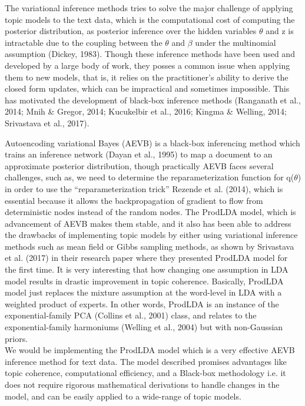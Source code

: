 \documentclass[11pt]{article}
\theoremstyle{definition}
\theoremstyle{theorem}
\newcommand{\response}{\medskip\noindent{\color{DarkBlue}\textbf{Response:}}}
\begin{document}
\response

The variational inference methods tries to solve the major challenge of applying topic models to the text data, which is the computational cost of computing the posterior distribution, as posterior inference over the hidden variables $\theta$ and z is intractable due to the coupling between the $\theta$ and $\beta$ under the multinomial assumption (Dickey, 1983). Though these inference methods have been used and developed by a large body of work, they posses a common issue when applying them to new models, that is, it relies on the practitioner’s ability to derive the closed form updates, which can be impractical and sometimes impossible. This has motivated the development of black-box inference methods (Ranganath et al., 2014; Mnih & Gregor, 2014; Kucukelbir et al., 2016; Kingma & Welling, 2014; Srivastava et al., 2017). 

Autoencoding variational Bayes (AEVB) is a black-box inferencing method which trains an inference network (Dayan et al., 1995) to map a document to an approximate posterior distribution, though practically AEVB faces several challenges, such as, we need to determine the reparameterization function for q($\theta$) in order to use the “reparameterization trick” Rezende et al. (2014), which is essential because it allows the backpropagation of gradient to flow from deterministic nodes instead of the random nodes. The ProdLDA model, which is advancement of AEVB makes them stable, and it also has been able to address the drawbacks of implementing topic models by either using variational inference methods such as mean field or Gibbs sampling methods, as shown by Srivastava et al. (2017) in their research paper where they presented ProdLDA model for the first time. It is very interesting that how changing one assumption in LDA model results in drastic improvement in topic coherence. Basically, ProdLDA model just replaces the mixture assumption at the word-level in LDA with a weighted product of experts. In other words, ProdLDA is an instance of the exponential-family PCA (Collins et al., 2001) class, and relates to the exponential-family harmoniums (Welling et al., 2004) but with non-Gaussian priors. \\

We would be implementing the ProdLDA model which is a very effective AEVB inference method for text data. The model described promises advantages like topic coherence, computational efficiency, and a Black-box methodology i.e. it does not require rigorous mathematical derivations to handle changes in the model, and can be easily applied to a wide-range of topic models.
\end{document}
